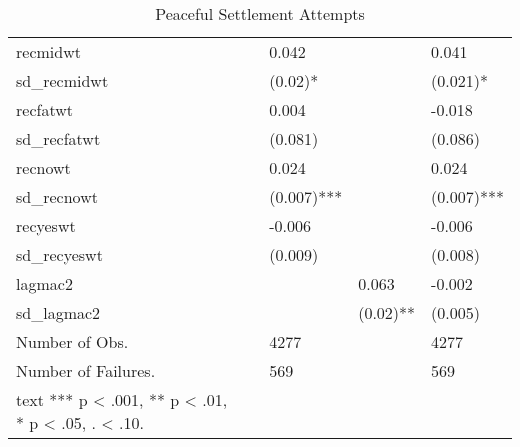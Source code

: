 \begin{table}[ht]
\begin{tabular}{lllll}
  recmidwt &  & 0.042 &  & 0.041 \\ 
  sd\_recmidwt &  & (0.02)* &  & (0.021)* \\ 
  recfatwt &  & 0.004 &  & -0.018 \\ 
  sd\_recfatwt &  & (0.081)  &  & (0.086)  \\ 
  recnowt &  & 0.024 &  & 0.024 \\ 
  sd\_recnowt &  & (0.007)*** &  & (0.007)*** \\ 
  recyeswt &  & -0.006 &  & -0.006 \\ 
  sd\_recyeswt &  & (0.009)  &  & (0.008)  \\ 
  lagmac2 &  &  & 0.063 & -0.002 \\ 
  sd\_lagmac2 &  &  & (0.02)** & (0.005)  \\ 
  Number of Obs. &  & 4277 &  & 4277 \\ 
  Number of Failures. &  & 569 &  & 569 \\ 
   \hline \footnotesize{ text *** 
 p < .001, ** p < .01, * p < .05, . < .10. }
\end{tabular}
\caption{Peaceful Settlement Attempts} 
\end{table}
